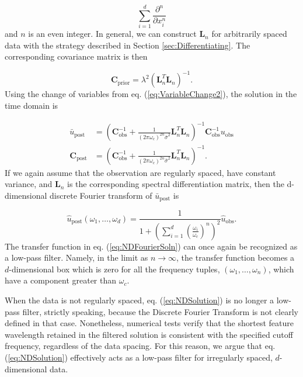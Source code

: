 \documentclass[10pt,a4paper]{article}
\begin{document}
\begin{equation}
  \sum_{i=1}^d\frac{\partial^n}{\partial x_i^n} 
\end{equation} 
and $n$ is an even integer. In general, we can construct $\mathbf{L}_n$ for arbitrarily spaced data with the strategy described in Section \ref{sec:Differentiating}. The corresponding covariance matrix is then

\begin{equation}\label{eq:NDCovariance}
\mathbf{C}_\mathrm{prior} = \lambda^2\left(\mathbf{L}_n^T\mathbf{L}_n\right)^{-1}. 
\end{equation}           
Using the change of variables from eq. (\ref{eq:VariableChange2}), the solution in the time domain is

\begin{equation}\label{eq:NDSolution}
\begin{split}
\bar{u}_\mathrm{post} &= (\mathbf{C}_\mathrm{obs}^{-1} +   
                   \frac{1}{(2\pi\omega_c)^{2n}\bar{\sigma}^2}\mathbf{L}_n^T\mathbf{L}_n)^{-1}\mathbf{C}_\mathrm{obs}^{-1}
                   u_\mathrm{obs}
\\
\mathbf{C}_\mathrm{post} &= (\mathbf{C}_\mathrm{obs}^{-1} +   
                            \frac{1}{(2\pi\omega_c)^{2n}\bar{\sigma}^2}\mathbf{L}_n^T\mathbf{L}_n)^{-1}.
\end{split}
\end{equation}
If we again assume that the observation are regularly spaced, have constant variance, and $\mathbf{L}_n$ is the corresponding spectral differentiation matrix, then the d-dimensional discrete Fourier transform of $\bar{u}_\mathrm{post}$ is 

\begin{equation}\label{eq:NDFourierSoln}
  \hat{u}_\mathrm{post}(\omega_1, \dots, \omega_d) = 
  \frac{1}{1 + \left(\sum_{i=1}^d \left(\frac{\omega_i}{\omega_c}\right)^n\right)^2} \hat{u}_\mathrm{obs}.
\end{equation}
The transfer function in eq. (\ref{eq:NDFourierSoln}) can once again be recognized as a low-pass filter.  Namely, in the limit as $n \to \infty$, the transfer function becomes a $d$-dimensional box which is zero for all the frequency tuples, $(\omega_1,\dots,\omega_n)$, which have a component greater than $\omega_c$.

When the data is not regularly spaced, eq. (\ref{eq:NDSolution}) is no longer a low-pass filter, strictly speaking, because the Discrete Fourier Transform is not clearly defined in that case. Nonetheless, numerical tests verify that the shortest feature wavelength retained in the filtered solution is consistent with the specified cutoff frequency, regardless of the data spacing.  For this reason, we argue that eq. (\ref{eq:NDSolution}) effectively acts as a low-pass filter for irregularly spaced, $d$-dimensional data.
\end{document}
